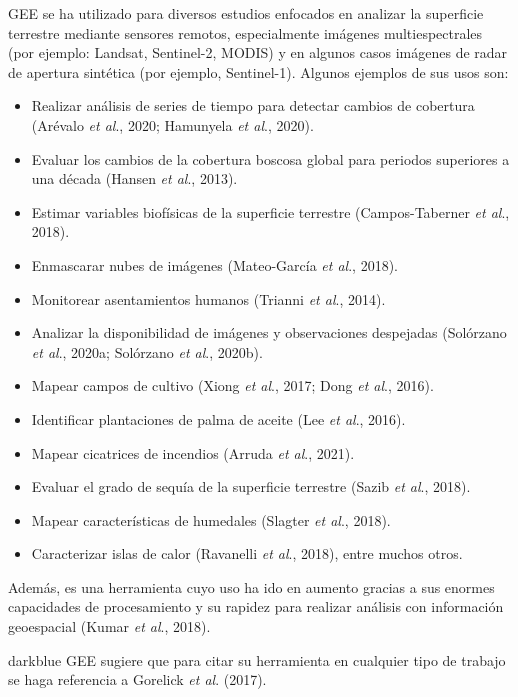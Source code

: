 \documentclass[
  12pt,
  letterpaper,
  twoside]{book}
\providecommand{\tightlist}{%
  \setlength{\itemsep}{0pt}\setlength{\parskip}{0pt}}
\begin{document}
GEE se ha utilizado para diversos estudios enfocados en analizar la superficie terrestre mediante sensores remotos, especialmente imágenes multiespectrales (por ejemplo: Landsat, Sentinel-2, MODIS) y en algunos casos imágenes de radar de apertura sintética (por ejemplo, Sentinel-1). Algunos ejemplos de sus usos son:

\begin{itemize}
\tightlist
\item
  Realizar análisis de series de tiempo para detectar cambios de cobertura (Arévalo \emph{et al}., 2020; Hamunyela \emph{et al}., 2020).
\item
  Evaluar los cambios de la cobertura boscosa global para periodos superiores a una década (Hansen \emph{et al}., 2013).
\item
  Estimar variables biofísicas de la superficie terrestre (Campos-Taberner \emph{et al}., 2018).
\item
  Enmascarar nubes de imágenes (Mateo-García \emph{et al}., 2018).
\item
  Monitorear asentamientos humanos (Trianni \emph{et al}., 2014).
\item
  Analizar la disponibilidad de imágenes y observaciones despejadas (Solórzano \emph{et al}., 2020a; Solórzano \emph{et al}., 2020b).
\item
  Mapear campos de cultivo (Xiong \emph{et al}., 2017; Dong \emph{et al}., 2016).
\item
  Identificar plantaciones de palma de aceite (Lee \emph{et al}., 2016).
\item
  Mapear cicatrices de incendios (Arruda \emph{et al}., 2021).
\item
  Evaluar el grado de sequía de la superficie terrestre (Sazib \emph{et al}., 2018).
\item
  Mapear características de humedales (Slagter \emph{et al}., 2018).
\item
  Caracterizar islas de calor (Ravanelli \emph{et al}., 2018), entre muchos otros.
\end{itemize}

Además, es una herramienta cuyo uso ha ido en aumento gracias a sus enormes capacidades de procesamiento y su rapidez para realizar análisis con información geoespacial (Kumar \emph{et al}., 2018).

\begin{bluebox2}

\begin{awesomeblock}{5pt}{\faLightbulb}{darkblue}
GEE sugiere que para citar su herramienta en cualquier tipo de trabajo se haga referencia a Gorelick \emph{et al}. (2017).

\end{awesomeblock}

\end{bluebox2}
\end{document}
